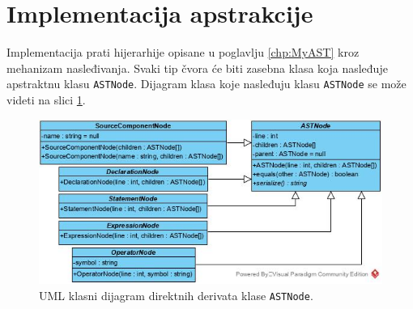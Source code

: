 \section{Implementacija apstrakcije}
\label{sec:ImplementationMyAST}

Implementacija prati hijerarhije opisane u poglavlju \ref{chp:MyAST} kroz mehanizam nasleđivanja. Svaki tip čvora će biti zasebna klasa koja nasleđuje apstraktnu klasu \texttt{ASTNode}. Dijagram klasa koje nasleđuju klasu \texttt{ASTNode} se može videti na slici \ref{fig:UMLASTNode}. 

\begin{figure}[h!]
\centering
\includegraphics[scale=0.7]{images/uml/ASTNode.jpg}
\caption{UML klasni dijagram direktnih derivata klase \texttt{ASTNode}.}
\label{fig:UMLASTNode}
\end{figure}
